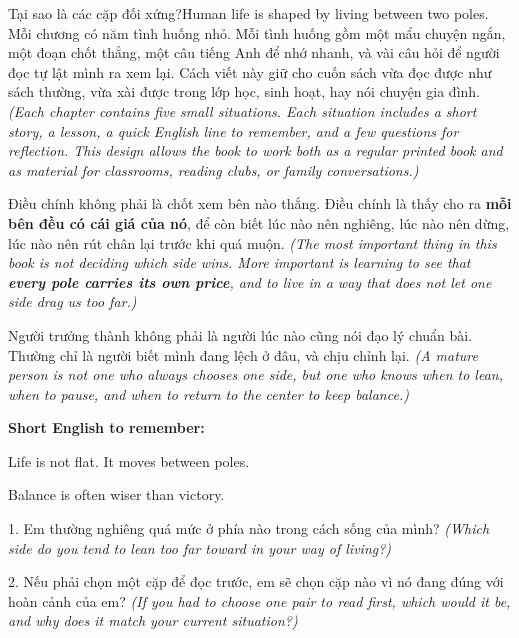 \begin{truyen}{Tại sao là các cặp đối xứng?}{Human life is shaped by living between two poles.}
Mỗi chương có năm tình huống nhỏ. Mỗi tình huống gồm một mẩu chuyện ngắn, một đoạn chốt thẳng, một câu tiếng Anh để nhớ nhanh, và vài câu hỏi để người đọc tự lật mình ra xem lại. Cách viết này giữ cho cuốn sách vừa đọc được như sách thường, vừa xài được trong lớp học, sinh hoạt, hay nói chuyện gia đình.
\textit{(Each chapter contains five small situations. Each situation includes a short story, a lesson, a quick English line to remember, and a few questions for reflection. This design allows the book to work both as a regular printed book and as material for classrooms, reading clubs, or family conversations.)}

Điều chính không phải là chốt xem bên nào thắng. Điều chính là thấy cho ra \textbf{mỗi bên đều có cái giá của nó}, để còn biết lúc nào nên nghiêng, lúc nào nên dừng, lúc nào nên rút chân lại trước khi quá muộn.
\textit{(The most important thing in this book is not deciding which side wins. More important is learning to see that \textbf{every pole carries its own price}, and to live in a way that does not let one side drag us too far.)}
\end{truyen}

\begin{baihoc}
Người trưởng thành không phải là người lúc nào cũng nói đạo lý chuẩn bài. Thường chỉ là người biết mình đang lệch ở đâu, và chịu chỉnh lại.
\textit{(A mature person is not one who always chooses one side, but one who knows when to lean, when to pause, and when to return to the center to keep balance.)}
\end{baihoc}

\begin{ghinhoanh}
\textbf{Short English to remember:}

Life is not flat. It moves between poles.

Balance is often wiser than victory.
\end{ghinhoanh}

\begin{tuhocnhanh}
1. Em thường nghiêng quá mức ở phía nào trong cách sống của mình? \textit{(Which side do you tend to lean too far toward in your way of living?)}

2. Nếu phải chọn một cặp để đọc trước, em sẽ chọn cặp nào vì nó đang đúng với hoàn cảnh của em? \textit{(If you had to choose one pair to read first, which would it be, and why does it match your current situation?)}
\end{tuhocnhanh}

\ngancach
